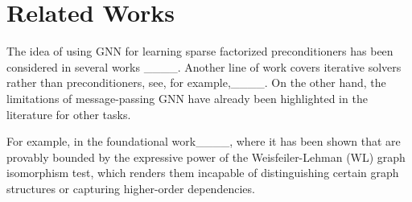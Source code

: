 \section{Related Works}
The idea of using GNN for learning sparse factorized preconditioners has been considered in several works 
____.
Another line of work covers iterative solvers rather than preconditioners, see, for example,____.
On the other hand, the limitations of message-passing GNN have already been highlighted in the literature for other tasks.

For example, in the foundational work____, where it has been shown
that are provably bounded by the expressive power of the Weisfeiler-Lehman (WL) graph isomorphism test, 
which renders them incapable of distinguishing 
certain graph structures or capturing higher-order dependencies.